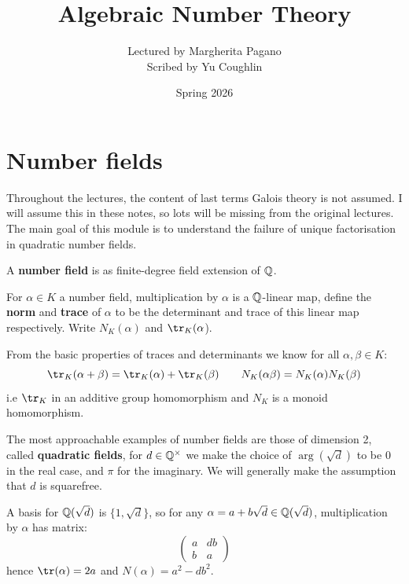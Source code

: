 \documentclass{article}
\begin{document}
\title{Algebraic Number Theory}
\author{Lectured by Margherita Pagano \\
Scribed by Yu Coughlin}
\date{Spring 2026}

\maketitle

\tableofcontents

\section{Number fields}

Throughout the lectures, the content of last terms Galois theory is not assumed. I will assume this in these notes, so lots will be missing from the original lectures. The main goal of this module is to understand the failure of unique factorisation in quadratic number fields.

\begin{definition}
    A \textbf{number field} is as finite-degree field extension of $\mathbb{Q}$.
\end{definition}

\begin{definition}
    For $\alpha \in K$ a number field, multiplication by $\alpha$ is a $\mathbb{Q}$-linear map, define the \textbf{norm} and \textbf{trace} of $\alpha$ to be the determinant and trace of this linear map respectively. Write $N_K(\alpha)$ and $\tr_K(\alpha$).
\end{definition}

From the basic properties of traces and determinants we know for all $\alpha,\beta\in K$: \[
\tr_K(\alpha+\beta) = \tr_K(\alpha) + \tr_K(\beta) \qquad N_K(\alpha\beta) = N_K(\alpha)N_K(\beta)
\] i.e $\tr_K$ in an additive group homomorphism and $N_K$ is a monoid homomorphism.

The most approachable examples of number fields are those of dimension 2, called \textbf{quadratic fields}, for $d\in \mathbb{Q}^\times$ we make the choice of $\arg(\sqrt{d})$ to be $0$ in the real case, and $\pi$ for the imaginary. We will generally make the assumption that $d$ is squarefree.

A basis for $\mathbb{Q}(\sqrt{d})$ is $\{1,\sqrt{d}\}$, so for any $\alpha=a+b\sqrt{d}\in \mathbb{Q}(\sqrt{d})$, multiplication by $\alpha$ has matrix: \[
    \begin{pmatrix}
        a & db \\ b & a
    \end{pmatrix}
\] hence $\tr(\alpha)=2a$ and $N(\alpha) = a^2-db^2$.
\end{document}
